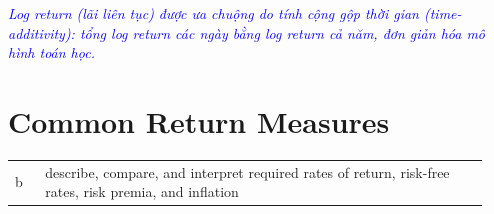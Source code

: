 \textcolor{blue}{\textit{Log return (lãi liên tục) được ưa chuộng do tính cộng gộp thời gian (time-additivity): tổng log return các ngày bằng log return cả năm, đơn giản hóa mô hình toán học.}}

\section{Common Return Measures}
\label{sec:Common Return Measures}
\begin{center}
\begin{tabular}{p{0.06\linewidth} | p{0.88\linewidth}}
	b & describe, compare, and interpret required rates of return, risk-free rates, risk premia, and inflation \\
\end{tabular}
\end{center}

